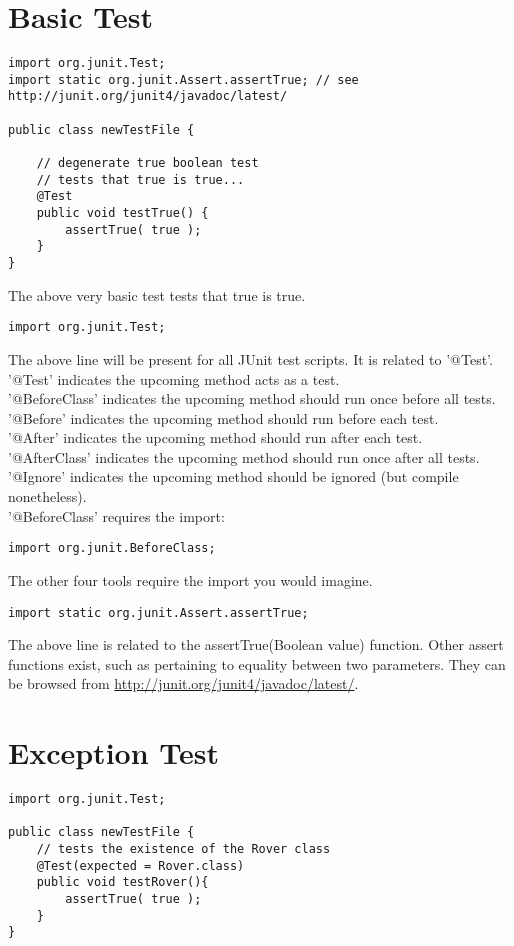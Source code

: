 \documentclass[11pt, a4paper]{article}
\begin{document}
\section{Basic Test}

	\lstset{language=Java}
	\begin{lstlisting}
import org.junit.Test;
import static org.junit.Assert.assertTrue; // see http://junit.org/junit4/javadoc/latest/

public class newTestFile {
	
	// degenerate true boolean test
	// tests that true is true...
	@Test
	public void testTrue() {
		assertTrue( true );
	}
}
	\end{lstlisting}
	The above very basic test tests that true is true.
	\begin{lstlisting}
import org.junit.Test;
	\end{lstlisting}
	The above line will be present for all JUnit test scripts. It is related to '@Test'.\\
	'@Test' indicates the upcoming method acts as a test.\\
	'@BeforeClass' indicates the upcoming method should run once before all tests.\\
	'@Before' indicates the upcoming method should run before each test.\\
	'@After' indicates the upcoming method should run after each test.\\
	'@AfterClass' indicates the upcoming method should run once after all tests.\\
	'@Ignore' indicates the upcoming method should be ignored (but compile nonetheless).\\
	'@BeforeClass' requires the import:
	\begin{lstlisting}
import org.junit.BeforeClass;
	\end{lstlisting}
	The other four tools require the import you would imagine.
	
	\begin{lstlisting}
import static org.junit.Assert.assertTrue;
	\end{lstlisting}
The above line is related to the assertTrue(Boolean value) function. Other assert functions exist, such as pertaining to equality between two parameters. They can be browsed from \url{http://junit.org/junit4/javadoc/latest/}.

\section{Exception Test}
	\begin{lstlisting}
import org.junit.Test;

public class newTestFile {
	// tests the existence of the Rover class
	@Test(expected = Rover.class)
	public void testRover(){
		assertTrue( true );
	}
}
	\end{lstlisting}
\end{document}
